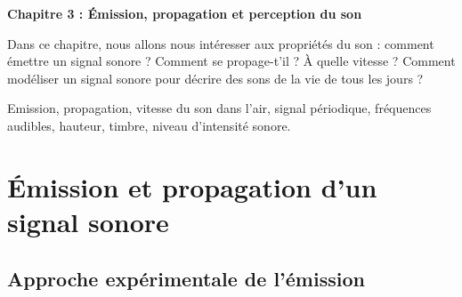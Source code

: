 \renewcommand{\thesubsection}{\textcolor{red}{\Roman{section}.\arabic{subsection}}}
\renewcommand{\thesubsubsection}{\textcolor{red}{\Roman{section}.\arabic{subsection}.\alph{subsubsection}}}

\setcounter{section}{0}
\sndEnTeteCoursTrois

\begin{mdframed}[style=titr, leftmargin=60pt, rightmargin=60pt, innertopmargin=7pt, innerbottommargin=7pt, innerrightmargin=8pt, innerleftmargin=8pt]

\begin{center}
\large{\textbf{Chapitre 3 : \'{E}mission, propagation et perception du son}}
\end{center}
\end{mdframed}
Dans ce chapitre, nous allons nous intéresser aux propriétés du son : comment émettre un signal sonore ? Comment se propage-t'il ? \`{A} quelle vitesse ? Comment modéliser un signal sonore pour décrire des sons de la vie de tous les jours ?

\begin{tcolorbox}[colback=blue!5!white,colframe=blue!75!black,title=Mots clés du chapitre :]
Emission, propagation, vitesse du son dans l'air, signal périodique, fréquences audibles, hauteur, timbre, niveau d'intensité sonore.
\end{tcolorbox}


\section{\'{E}mission et propagation d'un signal sonore}
\subsection{Approche expérimentale de l'émission}

